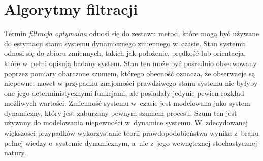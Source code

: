\chapter{Algorytmy filtracji}
\label{cha:algorytmy}
Termin \textit{filtracja optymalna} odnosi się do zestawu metod, które mogą być używane do estymacji stanu systemu dynamicznego zmiennego w~czasie. Stan systemu odnosi się do zbioru zmiennych, takich jak położenie, prędkość lub orientacja, które w~pełni opisują badany system. Stan ten może być pośrednio obserwowany poprzez pomiary obarczone szumem, którego obecność oznacza, że obserwacje są niepewne; nawet w przypadku znajomości prawdziwego stanu systemu nie byłyby one jego deterministycznymi funkcjami, ale posiadały jedynie pewien rozkład możliwych wartości. Zmienność systemu w~czasie jest modelowana jako system dynamiczny, który jest zaburzany pewnym szumem procesu. Szum ten jest używany do modelowania niepewności w~dynamice systemu. W~zdecydowanej większości przypadków wykorzystanie teorii prawdopodobieństwa wynika z~braku pełnej wiedzy o~systemie dynamicznym, a~nie z~jego wewnętrznej stochastycznej natury. \cite[1]{Sarka} \par 


